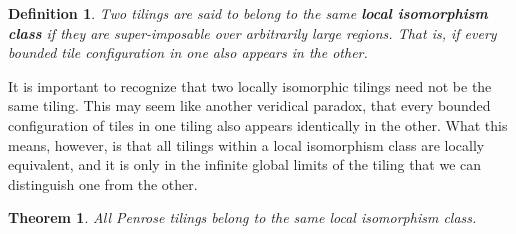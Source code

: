 \documentclass[
  oneside,
  11pt, a4paper,
  footinclude=true,
  headinclude=true,
  cleardoublepage=empty
]{scrbook}
\newtheorem{mydef}{Definition}
\newtheorem{mythm}{Theorem}
\begin{document}
 \begin{mydef}
 Two tilings are said to belong to the same \textbf{local isomorphism class} if they are super-imposable over arbitrarily large regions. That is, if every bounded tile configuration in one also appears in the other. \cite{Senechal1996}
 \end{mydef}
 
 It is important to recognize that two locally isomorphic tilings need not be the same tiling. This may seem like another veridical paradox, that every bounded configuration of tiles in one tiling also appears identically in the other. What this means, however, is that all tilings within a local isomorphism class are locally equivalent, and it is only in the infinite global limits of the tiling that we can distinguish one from the other.
 
 \begin{mythm}
 All Penrose tilings belong to the same local isomorphism class.
 \end{mythm}
 
\end{document}
